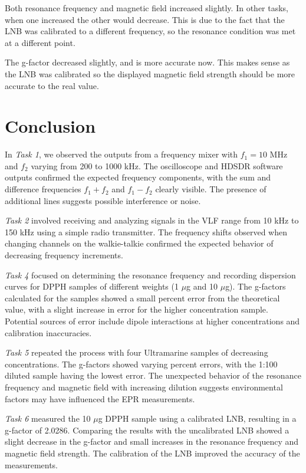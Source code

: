 \documentclass{article}
\begin{document}
Both resonance frequency and magnetic field increased slightly. In other tasks, when one increased the other would decrease. This is due to the fact that the LNB was calibrated to a different frequency, so the resonance condition was met at a different point.

The g-factor decreased slightly, and is more accurate now. This makes sense as the LNB was calibrated so the displayed magnetic field strength should be more accurate to the real value.

\pagebreak{}

\section{Conclusion}

In \textit{Task 1}, we observed the outputs from a frequency mixer with \(f_1 = 10\) MHz and \(f_2\) varying from 200 to 1000 kHz. The oscilloscope and HDSDR software outputs confirmed the expected frequency components, with the sum and difference frequencies \(f_1 + f_2\) and \(f_1 - f_2\) clearly visible. The presence of additional lines suggests possible interference or noise.

\textit{Task 2} involved receiving and analyzing signals in the VLF range from 10 kHz to 150 kHz using a simple radio transmitter. The frequency shifts observed when changing channels on the walkie-talkie confirmed the expected behavior of decreasing frequency increments.

\textit{Task 4} focused on determining the resonance frequency and recording dispersion curves for DPPH samples of different weights (1 $\mu$g and 10 $\mu$g). The g-factors calculated for the samples showed a small percent error from the theoretical value, with a slight increase in error for the higher concentration sample. Potential sources of error include dipole interactions at higher concentrations and calibration inaccuracies.

\textit{Task 5} repeated the process with four Ultramarine samples of decreasing concentrations. The g-factors showed varying percent errors, with the 1:100 diluted sample having the lowest error. The unexpected behavior of the resonance frequency and magnetic field with increasing dilution suggests environmental factors may have influenced the EPR measurements.

\textit{Task 6} measured the 10 $\mu$g DPPH sample using a calibrated LNB, resulting in a g-factor of 2.0286. Comparing the results with the uncalibrated LNB showed a slight decrease in the g-factor and small increases in the resonance frequency and magnetic field strength. The calibration of the LNB improved the accuracy of the measurements.


\pagebreak{}

 
 
\end{document}
